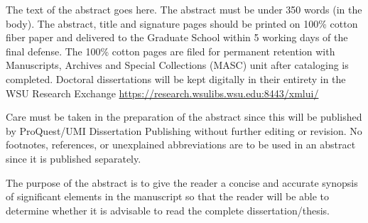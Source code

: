 The text of the abstract goes here. The abstract must be under 350 words (in the body). The abstract, title and signature pages should be printed on 100\% cotton fiber paper and delivered to the Graduate School within 5 working days of the final defense. The 100\% cotton pages are filed for permanent retention with Manuscripts, Archives and Special Collections (MASC) unit after cataloging is completed. Doctoral dissertations will be kept digitally in their entirety in the WSU Research Exchange \url{https://research.wsulibs.wsu.edu:8443/xmlui/}

Care must be taken in the preparation of the abstract since this will be published by ProQuest/UMI Dissertation Publishing without further editing or revision. No footnotes, references, or unexplained abbreviations are to be used in an abstract since it is published separately.

The purpose of the abstract is to give the reader a concise and accurate synopsis of significant elements in the manuscript so that the reader will be able to determine whether it is advisable to read the complete dissertation/thesis.
